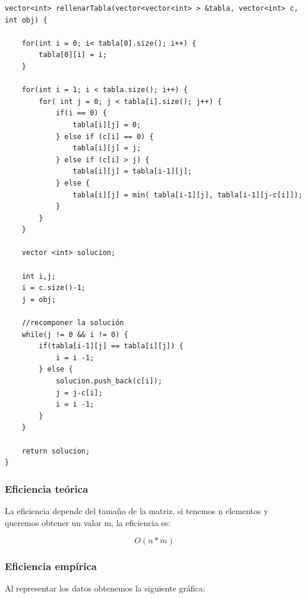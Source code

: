 \begin{lstlisting}
vector<int> rellenarTabla(vector<vector<int> > &tabla, vector<int> c, int obj) {

    for(int i = 0; i< tabla[0].size(); i++) {
        tabla[0][i] = i;
    }

    for(int i = 1; i < tabla.size(); i++) {
        for( int j = 0; j < tabla[i].size(); j++) {
            if(i == 0) {
                tabla[i][j] = 0;
            } else if (c[i] == 0) {
                tabla[i][j] = j;
            } else if (c[i] > j) {
                tabla[i][j] = tabla[i-1][j];
            } else {
                tabla[i][j] = min( tabla[i-1][j], tabla[i-1][j-c[i]]);
            }
        }
    }

    vector <int> solucion;

    int i,j;
    i = c.size()-1;
    j = obj;

    //recomponer la solución
    while(j != 0 && i != 0) {
        if(tabla[i-1][j] == tabla[i][j]) {
            i = i -1;
        } else {
            solucion.push_back(c[i]);
            j = j-c[i];
            i = i -1;
        }
    }

    return solucion;
}
\end{lstlisting}


\subsubsection{Eficiencia teórica}

La eficiencia depende del tamaño de la matriz, si tenemos n elementos y queremos obtener un valor m, la eficiencia es:

  \begin{equation}
      O(n*m)
  \end{equation}

\subsubsection{Eficiencia empírica}

Al representar los datos obtenemos la siguiente gráfica:

